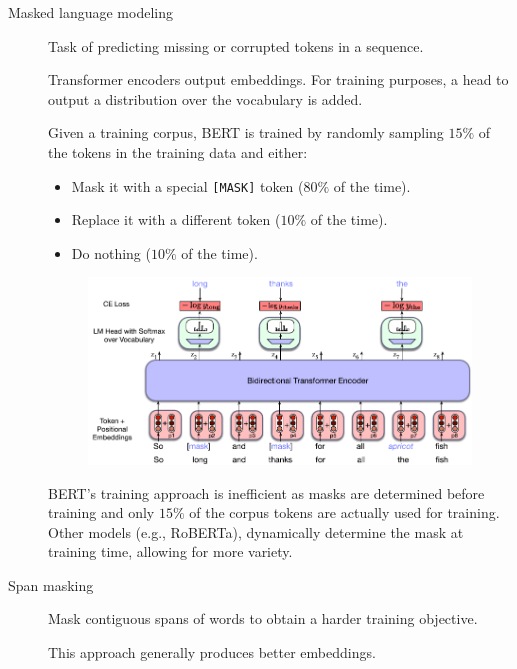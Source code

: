 \begin{description}
    \item[Masked language modeling] 
        Task of predicting missing or corrupted tokens in a sequence.

        \begin{remark}
            Transformer encoders output embeddings. For training purposes, a head to output a distribution over the vocabulary is added.
        \end{remark}

        \begin{example}
            Given a training corpus, BERT is trained by randomly sampling $15\%$ of the tokens in the training data and either:
            \begin{itemize}
                \item Mask it with a special \texttt{[MASK]} token ($80\%$ of the time).
                \item Replace it with a different token ($10\%$ of the time).
                \item Do nothing ($10\%$ of the time).
            \end{itemize}

            \begin{figure}[H]
                \centering
                \includegraphics[width=0.6\linewidth]{./img/_bert_training.pdf}
            \end{figure}

            \indenttbox
            \begin{remark}
                BERT's training approach is inefficient as masks are determined before training and only $15\%$ of the corpus tokens are actually used for training. Other models (e.g., RoBERTa), dynamically determine the mask at training time, allowing for more variety.
            \end{remark}
        \end{example}

    \item[Span masking] 
        Mask contiguous spans of words to obtain a harder training objective.

        \begin{remark}
            This approach generally produces better embeddings.
        \end{remark}
\end{description}


